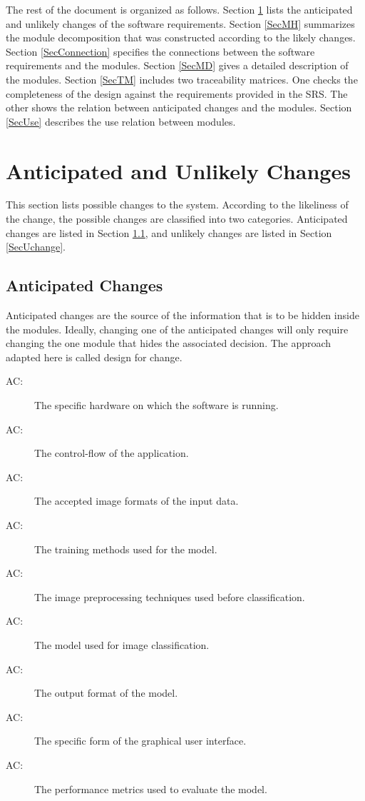 \documentclass[12pt, titlepage]{article}
\newcounter{acnum}
\newcommand{\actheacnum}{AC\theacnum}
\begin{document}
The rest of the document is organized as follows. Section
\ref{SecChange} lists the anticipated and unlikely changes of the software
requirements. Section \ref{SecMH} summarizes the module decomposition that
was constructed according to the likely changes. Section \ref{SecConnection}
specifies the connections between the software requirements and the
modules. Section \ref{SecMD} gives a detailed description of the
modules. Section \ref{SecTM} includes two traceability matrices. One checks
the completeness of the design against the requirements provided in the SRS. The
other shows the relation between anticipated changes and the modules. Section
\ref{SecUse} describes the use relation between modules.

\section{Anticipated and Unlikely Changes} \label{SecChange}

This section lists possible changes to the system. According to the likeliness
of the change, the possible changes are classified into two
categories. Anticipated changes are listed in Section \ref{SecAchange}, and
unlikely changes are listed in Section \ref{SecUchange}.

\subsection{Anticipated Changes} \label{SecAchange}

Anticipated changes are the source of the information that is to be hidden
inside the modules. Ideally, changing one of the anticipated changes will only
require changing the one module that hides the associated decision. The approach
adapted here is called design for
change.

\begin{description}
\item[ \actheacnum \label{acHardware}:] The specific
hardware on which the software is running.
\item[ \actheacnum \label{acApplication}:] The
control-flow of the application.
\item[ \actheacnum \label{acInput}:] The accepted image
formats of the input data.
\item[ \actheacnum \label{acTraining}:] The training
methods used for the model.
\item[ \actheacnum \label{acPreprocessing}:] The image
preprocessing techniques used before classification.
\item[ \actheacnum \label{acModel}:] The model used for
image classification.
\item[ \actheacnum \label{acOutput}:] The output format of
the model.
\item[ \actheacnum \label{acGUI}:] The specific form of
the graphical user interface.
\item[ \actheacnum \label{acPerformance}:] The performance
metrics used to evaluate the model.
\end{description}
\end{document}
